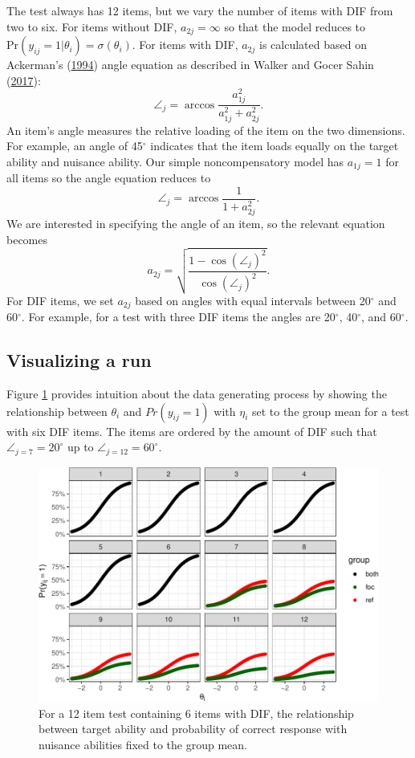 \documentclass[
  11pt,
]{article}
\begin{document}
The test always has 12 items, but we vary the number of items with DIF from two to six. For items without DIF, \(a_{2j} = \infty\) so that the model reduces to \(\text{Pr}(y_{ij} = 1 | \theta_i) = \sigma(\theta_i)\). For items with DIF, \(a_{2j}\) is calculated based on Ackerman's (\protect\hyperlink{ref-ackerman1994using}{1994}) angle equation as described in Walker and Gocer Sahin (\protect\hyperlink{ref-walker2017using}{2017}):
\[
\angle_j = \arccos \dfrac{a_{1j}^2}{a_{1j}^2 + a_{2j}^2}.
\]
An item's angle measures the relative loading of the item on the two dimensions. For example, an angle of 45\(^\circ\) indicates that the item loads equally on the target ability and nuisance ability. Our simple noncompensatory model has \(a_{1j} = 1\) for all items so the angle equation reduces to
\[
\angle_j = \arccos \dfrac{1}{1 + a_{2j}^2}.
\]
We are interested in specifying the angle of an item, so the relevant equation becomes
\[
a_{2j} = \sqrt{\dfrac{1 - \cos(\angle_j)^2}{\cos(\angle_j)^2}}.
\]
For DIF items, we set \(a_{2j}\) based on angles with equal intervals between 20\(^\circ\) and 60\(^\circ\). For example, for a test with three DIF items the angles are 20\(^\circ\), 40\(^\circ\), and 60\(^\circ\).

\hypertarget{visualizing-a-run}{%
\subsection{Visualizing a run}\label{visualizing-a-run}}

Figure \ref{fig:difmap} provides intuition about the data generating process by showing the relationship between \(\theta_i\) and \(Pr(y_{ij} = 1)\) with \(\eta_i\) set to the group mean for a test with six DIF items. The items are ordered by the amount of DIF such that \(\angle_{j = 7} = 20^\circ\) up to \(\angle_{j = 12} = 60^\circ\).

\begin{figure}[H]

{\centering \includegraphics[width=0.7\linewidth]{paper_files/figure-latex/difmap-1} 

}

\caption{For a 12 item test containing 6 items with DIF, the relationship between target ability and probability of correct response with nuisance abilities fixed to the group mean.}\label{fig:difmap}
\end{figure}
\end{document}
